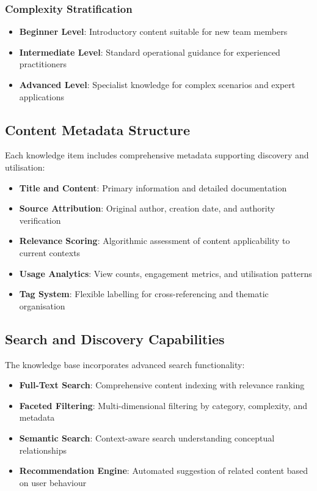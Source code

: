 \documentclass{article}
\begin{document}
\subsubsection{Complexity Stratification}
\begin{itemize}
    \item \textbf{Beginner Level}: Introductory content suitable for new team members
    \item \textbf{Intermediate Level}: Standard operational guidance for experienced practitioners
    \item \textbf{Advanced Level}: Specialist knowledge for complex scenarios and expert applications
\end{itemize}

\subsection{Content Metadata Structure}
Each knowledge item includes comprehensive metadata supporting discovery and utilisation:

\begin{itemize}
    \item \textbf{Title and Content}: Primary information and detailed documentation
    \item \textbf{Source Attribution}: Original author, creation date, and authority verification
    \item \textbf{Relevance Scoring}: Algorithmic assessment of content applicability to current contexts
    \item \textbf{Usage Analytics}: View counts, engagement metrics, and utilisation patterns
    \item \textbf{Tag System}: Flexible labelling for cross-referencing and thematic organisation
\end{itemize}

\subsection{Search and Discovery Capabilities}
The knowledge base incorporates advanced search functionality:

\begin{itemize}
    \item \textbf{Full-Text Search}: Comprehensive content indexing with relevance ranking
    \item \textbf{Faceted Filtering}: Multi-dimensional filtering by category, complexity, and metadata
    \item \textbf{Semantic Search}: Context-aware search understanding conceptual relationships
    \item \textbf{Recommendation Engine}: Automated suggestion of related content based on user behaviour
\end{itemize}
\end{document}
